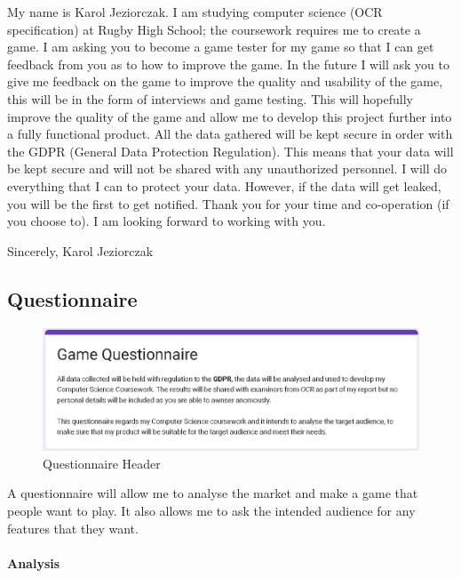 \documentclass{article}
\newcommand{\parBr}{\vspace{5mm}}%
\begin{document}
\begin{flushleft}
My name is Karol Jeziorczak. I am studying computer science (OCR specification) at Rugby High School; the coursework requires me to create a game. \linebreak
I am asking you to become a game tester for my game so that I can get feedback from you as to how to improve the game. In the future I will ask you to give me feedback on the game to improve the quality and usability of the game, this will be in the form of interviews and game testing. This will hopefully improve the quality of the game and allow me to develop this project further into a fully functional product. \linebreak
All the data gathered will be kept secure in order with the GDPR (General Data Protection Regulation). This means that your data will be kept secure and will not be shared with any unauthorized personnel. I will do everything that I can to protect your data. However, if the data will get leaked, you will be the first to get notified.  \linebreak
Thank you for your time and co-operation (if you choose to). I am looking forward to working with you.
 
\parBr

Sincerely, \linebreak Karol Jeziorczak
\end{flushleft}

\subsection{Questionnaire}
\begin{figure}[h]
\includegraphics[scale=0.65]{Questionnaire Screenshot}
\caption{Questionnaire Header}
\end{figure}

A questionnaire will allow me to analyse the market and make a game that people want to play. It also allows me to ask the intended audience for any features that they want.

\paragraph{Analysis}
 \linebreak
\end{document}
